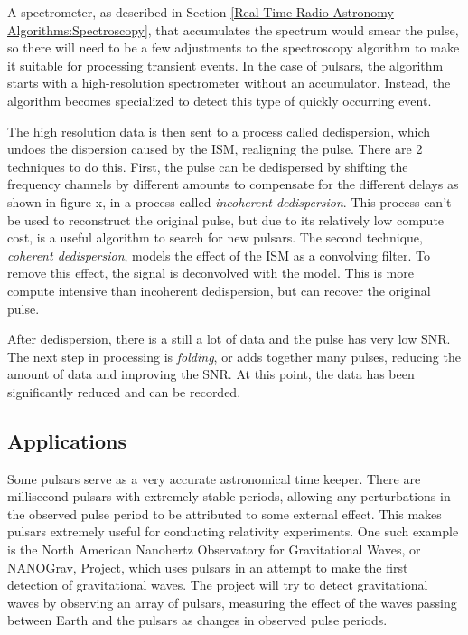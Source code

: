 A spectrometer, as described in Section \ref{Real Time Radio Astronomy Algorithms:Spectroscopy}, that accumulates the spectrum would smear the pulse, so there will need to be a few adjustments to the spectroscopy algorithm to make it suitable for processing transient events. 
In the case of pulsars, the algorithm starts with a high-resolution spectrometer without an accumulator. 
Instead, the algorithm becomes specialized to detect this type of quickly occurring event.

The high resolution data is then sent to a process called dedispersion, which undoes the dispersion caused by the ISM, realigning the pulse.
There are 2 techniques to do this.
First, the pulse can be dedispersed by shifting the frequency channels by different amounts to compensate for the different delays as shown in figure x, in a process called \emph{incoherent dedispersion}. %
This process can't be used to reconstruct the original pulse, but due to its relatively low compute cost, is a useful algorithm to search for new pulsars.
The second technique, \emph{coherent dedispersion}, models the effect of the ISM as a convolving filter. 
To remove this effect, the signal is deconvolved with the model.
This is more compute intensive than incoherent dedispersion, but can recover the original pulse.

After dedispersion, there is a still a lot of data and the pulse has very low SNR. 
The next step in processing is \emph{folding}, or adds together many pulses, reducing the amount of data and improving the SNR.
At this point, the data has been significantly reduced and can be recorded. 



%
\subsection{Applications}
Some pulsars serve as a very accurate astronomical time keeper.
There are millisecond pulsars with extremely stable periods, allowing any perturbations in the observed pulse period to be attributed to some external effect.
This makes pulsars extremely useful for conducting relativity experiments. 
One such example is the North American Nanohertz Observatory for Gravitational Waves, or NANOGrav, Project, %
which uses pulsars in an attempt to make the first detection of gravitational waves. 
The project will try to detect gravitational waves by observing an array of pulsars, measuring the effect of the waves passing between Earth and the pulsars as changes in observed pulse periods.

